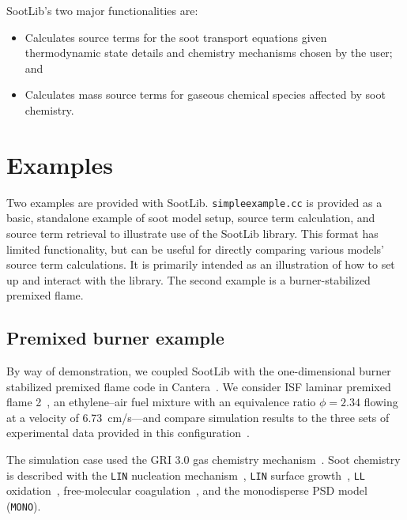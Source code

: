 \documentclass[preprint,letterpaper]{elsarticle}
\begin{document}
SootLib's two major functionalities are:
\begin{itemize}
    \item Calculates source terms for the soot transport equations given thermodynamic state details and chemistry mechanisms chosen by the user; and
    \item Calculates mass source terms for gaseous chemical species affected by soot chemistry.
\end{itemize}


\section{Examples}
\label{s:examples}

Two examples are provided with SootLib. 
\texttt{simple\textunderscore example.cc} is provided as a basic, standalone example of soot model setup, source term calculation, and source term retrieval to illustrate use of the SootLib library. This format has limited functionality, but can be useful for directly comparing various models' source term calculations. 
It is primarily intended as an illustration of how to set up and interact with the library. The second example is a burner-stabilized premixed flame.

\subsection{Premixed burner example}
\label{s:soot-examples-premixed}

By way of demonstration, we coupled SootLib with the one-dimensional burner stabilized premixed flame code in Cantera~\cite{Cantera}. We consider ISF laminar premixed flame 2~\cite{ISF4-P2}, an ethylene--air fuel mixture with an equivalence ratio $\phi=2.34$ flowing at a velocity of \qty{6.73}{\cm/\s}---and compare simulation results to the three sets of experimental data provided in this configuration~\cite{Xu_1997,Menon_2007}.

The simulation case used the GRI 3.0 gas chemistry mechanism~\cite{Smith_2002}. Soot chemistry is described with the \texttt{LIN} nucleation mechanism~\cite{Lindstedt_2005}, \texttt{LIN} surface growth~\cite{Lindstedt_1994}, \texttt{LL} oxidation~\cite{Leung_1991}, free-molecular coagulation~\cite{Seinfeld_2016}, and the monodisperse PSD model (\texttt{MONO}).
\end{document}
